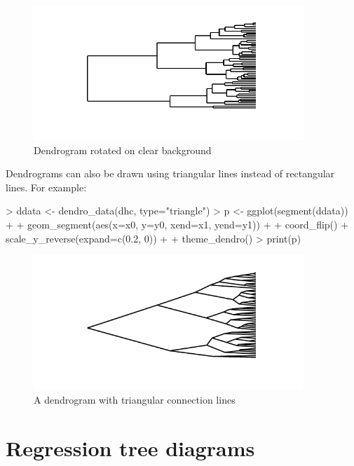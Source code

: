 \documentclass[10pt,oneside]{article}
\begin{document}
\begin{figure}[h]
\begin{center}
\includegraphics[width=4in, height=2in]{ggdendro-dendro2}
\end{center}
\caption{Dendrogram rotated on clear background}
\end{figure}

Dendrograms can also be drawn using triangular lines instead of rectangular lines.  For example:

\begin{Schunk}
\begin{Sinput}
> ddata <- dendro_data(dhc, type="triangle")
> p <- ggplot(segment(ddata)) + 
+     geom_segment(aes(x=x0, y=y0, xend=x1, yend=y1)) + 
+     coord_flip() + scale_y_reverse(expand=c(0.2, 0)) +
+     theme_dendro()
> print(p)
\end{Sinput}
\end{Schunk}

\begin{figure}[h]
\begin{center}
\includegraphics[width=4in, height=2in]{ggdendro-dendro3}
\end{center}
\caption{A dendrogram with triangular connection lines}
\end{figure}

  

\section{Regression tree diagrams}
\end{document}
